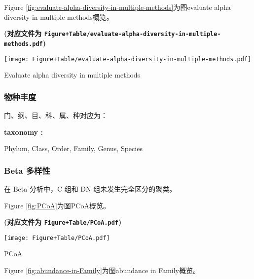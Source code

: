 \documentclass[
]{article}
\begin{document}
Figure \ref{fig:evaluate-alpha-diversity-in-multiple-methods}为图evaluate alpha diversity in multiple methods概览。

\textbf{(对应文件为 \texttt{Figure+Table/evaluate-alpha-diversity-in-multiple-methods.pdf})}

\def\@captype{figure}
\begin{center}
\texttt{[image: Figure+Table/evaluate-alpha-diversity-in-multiple-methods.pdf]}
\caption{Evaluate alpha diversity in multiple methods}\label{fig:evaluate-alpha-diversity-in-multiple-methods}
\end{center}

\hypertarget{ux7269ux79cdux4e30ux5ea6}{%
\subsubsection{物种丰度}\label{ux7269ux79cdux4e30ux5ea6}}

门、纲、目、科、属、种对应为：

\begin{center}\begin{tcolorbox}[colback=gray!10, colframe=gray!50, width=0.9\linewidth, arc=1mm, boxrule=0.5pt]
\textbf{
taxonomy
:}

\vspace{0.5em}

    Phylum, Class, Order, Family, Genus, Species

\vspace{2em}
\end{tcolorbox}
\end{center}

\hypertarget{beta-ux591aux6837ux6027}{%
\subsubsection{Beta 多样性}\label{beta-ux591aux6837ux6027}}

在 Beta 分析中，C 组和 DN 组未发生完全区分的聚类。

Figure \ref{fig:PCoA}为图PCoA概览。

\textbf{(对应文件为 \texttt{Figure+Table/PCoA.pdf})}

\def\@captype{figure}
\begin{center}
\texttt{[image: Figure+Table/PCoA.pdf]}
\caption{PCoA}\label{fig:PCoA}
\end{center}

Figure \ref{fig:abundance-in-Family}为图abundance in Family概览。
\end{document}
